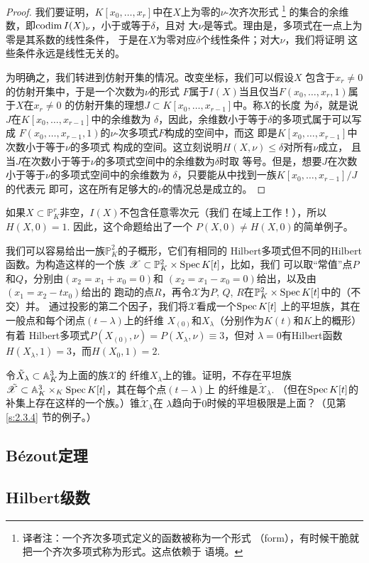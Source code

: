 \begin{proof}
我们要证明，$K[x_0,\dots,x_r]$中在$X$上为零的$\nu$-次齐次形式%
\footnote{译者注：一个齐次多项式定义的函数被称为一个形式
（form），有时候干脆就把一个齐次多项式称为形式。这点依赖于
语境。}%
的集合的余维数，即$\operatorname{codim} I(X)_\nu$，小于或等于$\delta$，且对
大$\nu$是等式。理由是，多项式在一点上为零是其系数的线性条件，
于是在$X$为零对应$\delta$个线性条件；对大$\nu$，我们将证明
这些条件永远是线性无关的。

为明确之，我们转进到仿射开集的情况。改变坐标，我们可以假设$X$
包含于$x_r\neq 0$的仿射开集中，于是一个次数为$\nu$的形式
$F$属于$I(X)$当且仅当$F(x_0,\dots,x_r,1)$属于$X$在$x_r\neq 0$
的仿射开集的理想$J\subset K[x_0,\dots,x_{r-1}]$中。称$X$的长度
为$\delta$，就是说$J$在$K[x_0,\dots,x_{r-1}]$中的余维数为
$\delta$，因此，余维数小于等于$\delta$的多项式属于可以写成
$F(x_0,\dots,x_{r-1},1)$的$\nu$-次多项式$F$构成的空间中，而这
即是$K[x_0,\dots,x_{r-1}]$中次数小于等于$\nu$的多项式
构成的空间。这立刻说明$H(X,\nu)\leq \delta$对所有$\nu$成立，
且当$J$在次数小于等于$\nu$的多项式空间中的余维数为$\delta$时取
等号。但是，想要$J$在次数小于等于$\nu$的多项式空间中的余维数为
$\delta$，只要能从中找到一族$K[x_0,\dots,x_{r-1}]/J$的代表元
即可，这在所有足够大的$\nu$的情况总是成立的。
\end{proof}

如果$X\subset \mathbb P_K^r$非空，$I(X)$不包含任意零次元（我们
在域上工作！），所以$H(X,0)=1$. 因此，这个命题给出了一个
$P(X,0)\neq H(X,0)$的简单例子。

我们可以容易给出一族$\mathbb P_K^2$的子概形，它们有相同的
Hilbert多项式但不同的Hilbert函数。为构造这样的一个族
$\mathscr X\subset \mathbb P_K^2\times \operatorname{Spec} K[t]$，比如，我们
可以取“常值”点$P$和$Q$，分别由$(x_2=x_1+x_0=0)$和
$(x_2=x_1-x_0=0)$给出，以及由$(x_1=x_2-tx_0)$给出的
跑动的点$R$，再令$\mathscr X$为$P$, $Q$, $R$在$\mathbb P_K^2
\times \operatorname{Spec} K[t]$中的（不交）并。
通过投影的第二个因子，我们将$\mathscr X$看成一个$\operatorname{Spec} K[t]$
上的平坦族，其在一般点和每个闭点$(t-\lambda)$上的纤维
$X_{(0)}$和$X_\lambda$（分别作为$K(t)$和$K$上的概形）有着
Hilbert多项式$P(X_{(0)},\nu)=P(X_\lambda,\nu)\equiv 3$，但对
$\lambda =0$有Hilbert函数$H(X_{\lambda},1)=3$，而$H(X_0,1)=2$.

\begin{exe}\label{exe:3.60}
令$\tilde{X}_{\lambda}\subset \mathbb{A}_K^3$为上面的族$\mathscr X$的
纤维$X_\lambda$上的锥。证明，不存在平坦族$\tilde{\mathscr X}
\subset \mathbb{A}_K^3\times_K \operatorname{Spec} K[t]$，其在每个点$(t-\lambda)$上
的纤维是$\tilde{\mathscr X}_\lambda$. （但在$\operatorname{Spec} K[t]$的
补集上存在这样的一个族。）锥$\tilde{\mathscr X}_\lambda$在
$\lambda$趋向于$0$时候的平坦极限是上面？（见第 \ref{s:2.3.4}
节的例子。）
\end{exe}

\subsection{B\'{e}zout定理}\label{s:3.3.5}

\subsection{Hilbert级数}\label{s:3.3.6}
